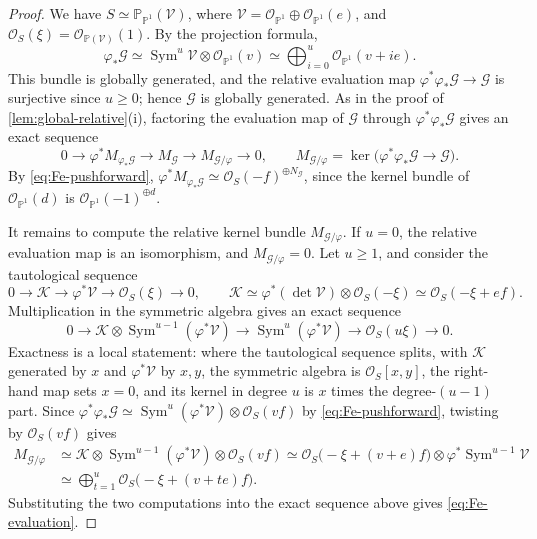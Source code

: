 \documentclass[11pt,reqno]{amsart}
\numberwithin{equation}{section}
\theoremstyle{remark}
\newcommand{\sshf}[1]{\mathcal{O}_{#1}}
\newcommand{\shf}[1]{\mathscr{#1}}
\newcommand{\prj}[1]{\mathbb{P}^{#1}}
\newcommand{\Sym}{\operatorname{Sym}}
\begin{document}
\begin{proof}
We have \(S\simeq\mathbb P_{\prj{1}}(\shf{V})\), where \(\shf{V}=\sshf{\prj{1}}\oplus\sshf{\prj{1}}(e)\), and \(\sshf{S}(\xi)=\sshf{\mathbb P(\shf{V})}(1)\). By the projection formula,
\begin{equation}\label{eq:Fe-pushforward}
 \varphi_*\shf{G}
 \simeq\Sym^u\shf{V}\otimes\sshf{\prj{1}}(v)
 \simeq\bigoplus_{i=0}^u\sshf{\prj{1}}(v+ie).
\end{equation}
This bundle is globally generated, and the relative evaluation map \(\varphi^*\varphi_*\shf{G}\to\shf{G}\) is surjective since \(u\geq0\); hence \(\shf{G}\) is globally generated. As in the proof of \cref{lem:global-relative}\textup{(i)}, factoring the evaluation map of \(\shf{G}\) through \(\varphi^*\varphi_*\shf{G}\) gives an exact sequence
\[
0\longrightarrow\varphi^*M_{\varphi_*\shf{G}}
 \longrightarrow M_{\shf{G}}
 \longrightarrow M_{\shf{G}/\varphi}\longrightarrow0,
 \qquad M_{\shf{G}/\varphi}=\ker\bigl(\varphi^*\varphi_*\shf{G}\to\shf{G}\bigr).
\]
By \eqref{eq:Fe-pushforward}, \(\varphi^*M_{\varphi_*\shf{G}}\simeq\sshf{S}(-f)^{\oplus N_{\shf{G}}}\), since the kernel bundle of \(\sshf{\prj{1}}(d)\) is \(\sshf{\prj{1}}(-1)^{\oplus d}\).

It remains to compute the relative kernel bundle \(M_{\shf{G}/\varphi}\). If \(u=0\), the relative evaluation map is an isomorphism, and \(M_{\shf{G}/\varphi}=0\). Let \(u\geq1\), and consider the tautological sequence
\[
 0\longrightarrow\shf{K}\longrightarrow\varphi^*\shf{V}
 \longrightarrow\sshf{S}(\xi)\longrightarrow0,\qquad
 \shf{K}\simeq\varphi^*(\det\shf{V})\otimes\sshf{S}(-\xi)
 \simeq\sshf{S}(-\xi+ef).
\]
Multiplication in the symmetric algebra gives an exact sequence
\[
 0\longrightarrow
 \shf{K}\otimes\Sym^{u-1}(\varphi^*\shf{V})
 \longrightarrow\Sym^u(\varphi^*\shf{V})
 \longrightarrow\sshf{S}(u\xi)\longrightarrow0.
\]
Exactness is a local statement: where the tautological sequence splits, with \(\shf{K}\) generated by \(x\) and \(\varphi^*\shf{V}\) by \(x,y\), the symmetric algebra is \(\sshf{S}[x,y]\), the right-hand map sets \(x=0\), and its kernel in degree \(u\) is \(x\) times the degree-\((u-1)\) part. Since \(\varphi^*\varphi_*\shf{G}\simeq\Sym^u(\varphi^*\shf{V})\otimes\sshf{S}(vf)\) by \eqref{eq:Fe-pushforward}, twisting by \(\sshf{S}(vf)\) gives
\begin{align*}
M_{\shf{G}/\varphi} &\simeq \shf{K}\otimes\Sym^{u-1}(\varphi^*\shf{V})\otimes \sshf{S}(vf)
 \simeq\sshf{S}\bigl(-\xi+(v+e)f\bigr)
       \otimes\varphi^*\Sym^{u-1}\shf{V}\\
 &\simeq\bigoplus_{t=1}^u
       \sshf{S}\bigl(-\xi+(v+te)f\bigr).
\end{align*}
Substituting the two computations into the exact sequence above gives \eqref{eq:Fe-evaluation}.
\end{proof}
\end{document}
